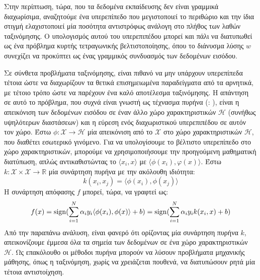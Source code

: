Στην περίπτωση, τώρα, που τα δεδομένα εκπαίδευσης δεν είναι γραμμικά διαχωρίσιμα, αναζητούμε ένα υπερεπίπεδο που μεγιστοποιεί το περιθώριο και την ίδια στιγμή ελαχιστοποιεί μία ποσότητα αντιστρόφως ανάλογη στο πλήθος των λαθών ταξινόμησης.
Ο υπολογισμός αυτού του υπερεπιπέδου μπορεί και πάλι να διατυπωθεί ως ένα πρόβλημα κυρτής τετραγωνικής βελτιστοποίησης, όπου το διάνυσμα λύσης $w$ συνεχίζει να προκύπτει ως ένας γραμμικός συνδυασμός των δεδομένων εισόδου.\par
Σε σύνθετα προβλήματα ταξινόμησης, είναι πιθανό να μην υπάρχουν υπερεπίπεδα τέτοια ώστε να διαχωρίζουν τα θετικά επισημειωμένα παραδείγματα από τα αρνητικά, με τέτοιο τρόπο ώστε να παρέχουν ένα καλό αποτέλεσμα ταξινόμησης.
Η απάντηση σε αυτό το πρόβλημα, που συχνά είναι γνωστή ως τέχνασμα πυρήνα (: \cite{Aizerman67theoretical, Boser1992}), είναι η απεικόνιση των δεδομένων εισόδου σε έναν άλλο χώρο χαρακτηριστικών $\mathcal{H}$ (συνήθως υψηλότερων διαστάσεων) και η εύρεση ενός διαχωριστικού υπερεπιπέδου σε αυτόν τον χώρο.
Έστω $\mathcal{\phi} : \mathcal{X} \rightarrow \mathcal{H}$ μία απεικόνιση από το $\mathcal{X}$ στο χώρο χαρακτηριστικών $\mathcal{H}$, που διαθέτει εσωτερικό γινόμενο.
Για να υπολογίσουμε το βέλτιστο υπερεπίπεδο στο χώρο χαρακτηριστικών, μπορούμε να χρησιμοποιήσουμε την προηγούμενη μαθηματική διατύπωση, απλώς αντικαθιστώντας το $\langle x_{i} , x \rangle$ με $\langle \phi(x_{i}), φ(x) \rangle$.
Έστω $k : \mathcal{X} \times \mathcal{X} \rightarrow \mathbb{R}$ μία συνάρτηση πυρήνα με την ακόλουθη ιδιότητα:
\begin{equation}
k(x_{i}, x_{j}) = \langle \phi (x_{i}), \phi (x_{j}) \rangle    
\end{equation}
Η συνάρτηση απόφασης $f$ μπορεί, τώρα, να γραφτεί ως:
\begin{equation}
f(x) = \operatorname{sign}(\sum_{i=1}^{N}\alpha_{i} y_{i} \langle \phi(x_{i}), \phi(x) \rangle + b ) = \operatorname{sign}(\sum_{i=1}^{N}\alpha_{i}y_{i} k(x_{i}, x) + b)
\end{equation}
Από την παραπάνω ανάλυση, είναι φανερό ότι ορίζοντας μία συνάρτηση πυρήνα $k$, απεικονίζουμε έμμεσα όλα τα σημεία των δεδομένων σε ένα χώρο χαρακτηριστικών $\mathcal{H}$. 
Ως επακόλουθο οι μέθοδοι πυρήνα μπορούν να λύσουν προβλήματα μηχανικής μάθησης, όπως η ταξινόμηση, χωρίς να χρειάζεται πουθενά, να διατυπώσουν ρητά μία τέτοια αντιστοίχηση.

